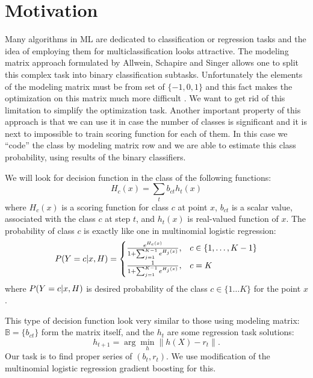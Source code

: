 \documentclass{article}
\begin{document}
\section{Motivation}

Many algorithms in ML are dedicated to classification or regression tasks and the idea of employing them for multiclassification looks attractive. The modeling matrix approach formulated by Allwein, Schapire and Singer \cite{Allwein00reducingmulticlass} allows one to split this complex task into binary classification subtasks. Unfortunately the elements of the modeling matrix must be from set of $\{-1,0,1\}$ and this fact makes the optimization on this matrix much more difficult \cite{Zhao_sparseoutput, modelmatrix2}. We want to get rid of this limitation to simplify the optimization task. Another important property of this approach is that we can use it in case the number of classes is significant and it is next to impossible to train scoring function for each of them. In this case we ``code'' the class by modeling matrix row and we are able to estimate this class probability, using results of the binary classifiers.

We will look for decision function in the class of the following functions:
\begin{equation}
H_c(x) = \sum_t b_{ct} h_t(x) 
\end{equation}
where $H_c(x)$ is a scoring function for class $c$ at point $x$, $b_{ct}$ is a scalar value, associated with the class $c$ at step $t$, and $h_t(x)$ is real-valued function of $x$. The probability of class $c$ is exactly like one in multinomial logistic regression:
\begin{equation}
  P(Y = c \arrowvert x, H) =
  \begin{cases}
    \frac{ e^{H_{c}(x)} }
       { 1+\sum_{j=1}^{K-1} e^{H_{j}(x)} }
    , & c \in \{1, \ldots, K-1 \} \\

    \frac{ 1 }
       { 1 + \sum_{j=1}^{K-1} e^{H_{j}(x)} }
    , & c=K
  \end{cases}\label{eq:MLR_model}
\end{equation}
where $P(Y = c \arrowvert x, H)$ is desired probability of the class $c \in \{1\ldots K\}$ for the point $x$.

This type of decision function look very similar to those using modeling matrix: $\mathbb{B} = \{b_{ct}\}$ form the matrix itself, and the $h_t$ are some regression task solutions:
\begin{equation}
h_{t+1} = \arg \min_h \|h(X) - r_t\|.
\end{equation}
Our task is to find proper series of $(b_t, r_t)$. We use modification of the multinomial logistic regression gradient boosting for this.
\end{document}
